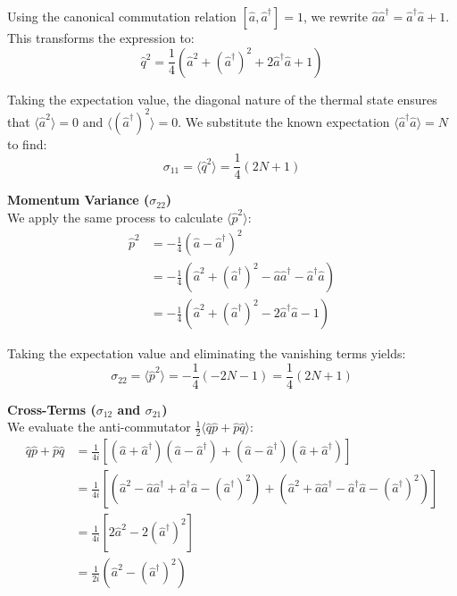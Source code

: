 {Using the canonical commutation relation $[\hat{a}, \hat{a}^{\dagger}] = 1$, we rewrite $\hat{a}\hat{a}^{\dagger} = \hat{a}^{\dagger}\hat{a} + 1$. This transforms the expression to:
\begin{equation*}
    \hat{q}^2 = \frac{1}{4}\left(\hat{a}^2 + (\hat{a}^{\dagger})^2 + 2\hat{a}^{\dagger}\hat{a} + 1\right)
\end{equation*}

Taking the expectation value, the diagonal nature of the thermal state ensures that $\langle\hat{a}^2\rangle = 0$ and $\langle(\hat{a}^{\dagger})^2\rangle = 0$. We substitute the known expectation $\langle\hat{a}^{\dagger}\hat{a}\rangle = N$ to find:
\begin{equation*}
    \sigma_{11} = \langle\hat{q}^2\rangle = \frac{1}{4}(2N + 1)
\end{equation*}

\textbf{Momentum Variance ($\sigma_{22}$)} \\
We apply the same process to calculate $\langle\hat{p}^2\rangle$:
\begin{align*}
    \hat{p}^2 &= -\frac{1}{4}\left(\hat{a} - \hat{a}^{\dagger}\right)^2 \nonumber \\
    &= -\frac{1}{4}\left(\hat{a}^2 + (\hat{a}^{\dagger})^2 - \hat{a}\hat{a}^{\dagger} - \hat{a}^{\dagger}\hat{a}\right) \nonumber \\
    &= -\frac{1}{4}\left(\hat{a}^2 + (\hat{a}^{\dagger})^2 - 2\hat{a}^{\dagger}\hat{a} - 1\right)
\end{align*}

Taking the expectation value and eliminating the vanishing terms yields:
\begin{equation*}
    \sigma_{22} = \langle\hat{p}^2\rangle = -\frac{1}{4}(-2N - 1) = \frac{1}{4}(2N + 1)
\end{equation*}

\textbf{Cross-Terms ($\sigma_{12}$ and $\sigma_{21}$)} \\
We evaluate the anti-commutator $\frac{1}{2}\langle\hat{q}\hat{p} + \hat{p}\hat{q}\rangle$:
\begin{align*}
    \hat{q}\hat{p} + \hat{p}\hat{q} &= \frac{1}{4i} \left[ (\hat{a}+\hat{a}^{\dagger})(\hat{a}-\hat{a}^{\dagger}) + (\hat{a}-\hat{a}^{\dagger})(\hat{a}+\hat{a}^{\dagger}) \right] \nonumber \\
    &= \frac{1}{4i} \left[ (\hat{a}^2 - \hat{a}\hat{a}^{\dagger} + \hat{a}^{\dagger}\hat{a} - (\hat{a}^{\dagger})^2) + (\hat{a}^2 + \hat{a}\hat{a}^{\dagger} - \hat{a}^{\dagger}\hat{a} - (\hat{a}^{\dagger})^2) \right] \nonumber \\
    &= \frac{1}{4i} \left[ 2\hat{a}^2 - 2(\hat{a}^{\dagger})^2 \right] \nonumber \\
    &= \frac{1}{2i} \left( \hat{a}^2 - (\hat{a}^{\dagger})^2 \right)
\end{align*}

}
